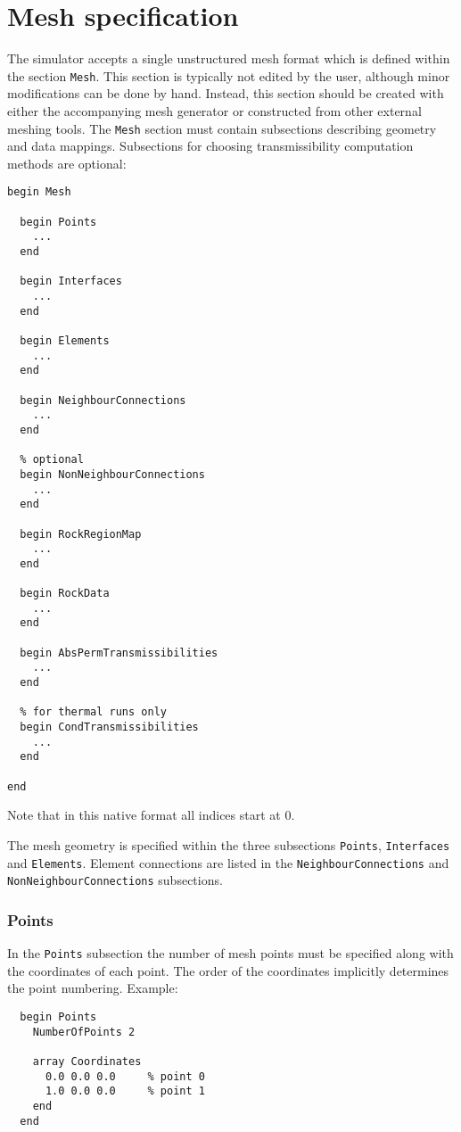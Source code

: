 \chapter{Mesh specification}
\label{chapter:mesh}

\minitoc

The simulator accepts a single unstructured mesh format which is
defined within the section \texttt{Mesh}. This section is typically
not edited by the user, although minor modifications can be done by
hand. Instead, this section should be created with either the
accompanying mesh generator or constructed from other external meshing
tools. The \texttt{Mesh} section must contain subsections describing
geometry and data mappings. Subsections for choosing transmissibility
computation methods are optional:
%
\begin{verbatim}
begin Mesh

  begin Points
    ...
  end

  begin Interfaces
    ...
  end

  begin Elements
    ...
  end

  begin NeighbourConnections
    ...
  end

  % optional
  begin NonNeighbourConnections
    ...
  end

  begin RockRegionMap
    ...
  end

  begin RockData
    ...
  end

  begin AbsPermTransmissibilities
    ...
  end

  % for thermal runs only
  begin CondTransmissibilities
    ...
  end

end
\end{verbatim}
%
Note that in this native format all indices start at 0. 

\label{sec:geometry}

The mesh geometry is specified within the three subsections
\texttt{Points}, \texttt{Interfaces} and \texttt{Elements}.  Element
connections are listed in the \texttt{NeighbourConnections} and
\texttt{NonNeighbourConnections} subsections.

\subsection{Points}
\label{sec:points}
In the \texttt{Points} subsection the number of mesh points must be
specified along with the coordinates of each point. The order of the
coordinates implicitly determines the point numbering. Example:
%
\begin{verbatim}
  begin Points
    NumberOfPoints 2

    array Coordinates
      0.0 0.0 0.0     % point 0
      1.0 0.0 0.0     % point 1
    end
  end
\end{verbatim}


